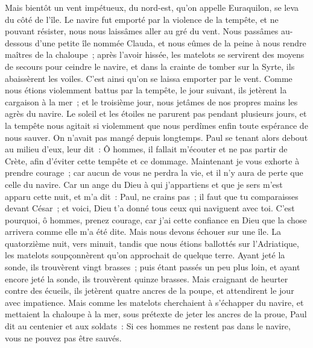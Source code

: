 \begin{multicols}{2}
Mais bientôt un vent impétueux, du nord-est, qu'on appelle Euraquilon, se leva du côté de l'île.
Le navire fut emporté par la violence de la tempête, et ne pouvant résister, nous nous laissâmes aller au gré du vent.
Nous passâmes au-dessous d'une petite île nommée Clauda, et nous eûmes de la peine à nous rendre maîtres de la chaloupe~;
après l'avoir hissée, les matelots se servirent des moyens de secours pour ceindre le navire, et dans la crainte de tomber sur la Syrte, ils abaissèrent les voiles. C'est ainsi qu'on se laissa emporter par le vent.
Comme nous étions violemment battus par la tempête, le jour suivant, ils jetèrent la cargaison à la mer~;
et le troisième jour, nous jetâmes de nos propres mains les agrès du navire.
Le soleil et les étoiles ne parurent pas pendant plusieurs jours, et la tempête nous agitait si violemment que nous perdîmes enfin toute espérance de nous sauver.
On n'avait pas mangé depuis longtemps. Paul se tenant alors debout au milieu d'eux, leur dit~: Ô hommes, il fallait m'écouter et ne pas partir de Crète, afin d'éviter cette tempête et ce dommage.
Maintenant je vous exhorte à prendre courage~; car aucun de vous ne perdra la vie, et il n'y aura de perte que celle du navire.
Car un ange du Dieu à qui j'appartiens et que je sers m'est apparu cette nuit,
et m'a dit~: Paul, ne crains pas~; il faut que tu comparaisses devant César~; et voici, Dieu t'a donné tous ceux qui naviguent avec toi.
C'est pourquoi, ô hommes, prenez courage, car j'ai cette confiance en Dieu que la chose arrivera comme elle m'a été dite.
Mais nous devons échouer sur une île.
La quatorzième nuit, vers minuit, tandis que nous étions ballottés sur l'Adriatique, les matelots soupçonnèrent qu'on approchait de quelque terre.
Ayant jeté la sonde, ils trouvèrent vingt brasses~; puis étant passés un peu plus loin, et ayant encore jeté la sonde, ils trouvèrent quinze brasses.
Mais craignant de heurter contre des écueils, ils jetèrent quatre ancres de la poupe, et attendirent le jour avec impatience.
Mais comme les matelots cherchaient à s'échapper du navire, et mettaient la chaloupe à la mer, sous prétexte de jeter les ancres de la proue,
Paul dit au centenier et aux soldats~: Si ces hommes ne restent pas dans le navire, vous ne pouvez pas être sauvés.

\end{multicols}
